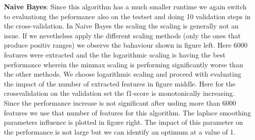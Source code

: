 \documentclass[11pt]{article}
\begin{document}
\textbf{Naive Bayes}:
Since this algorithm has a much smaller runtime we again switch to evaluationg the peformance also on the testset and doing 10 validation steps in the cross-validation. In Naive Bayes the scaling the scaling is generally not an issue. If we nevetheless apply the different scaling methods (only the ones that produce positiv ranges) we observe the bahaviour shown in figure \label{spamfig_fig3} left. Here 6000 features were extracted and the the logarithmic scaling is having the best performance wherein the minmax scaling is performing significantly worse than the other methods. We choose logarithmic scaling and proceed with evaluating the impact of the number of extracted features in figure \label{spamfig_fig3}  middle. Here for the crossvalidation on the validation set the f1-score is monotonically increasing. Since the performance increase is not significant after usding more than 6000 features we use that number of features for this algorithm. The laplace smoothing parameters influence is plotted in figure \label{spamfig_fig3} right. The impact of this parameter on the performance is not large but we can identify an optimum at a value of 1.
\end{document}
